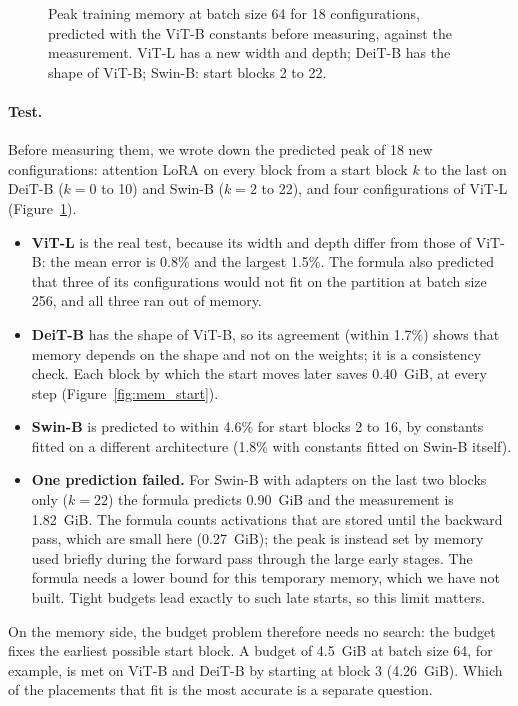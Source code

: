 \begin{figure}[!htb]
\centering

\caption{Peak training memory at batch size 64 for 18 configurations, predicted with the ViT-B constants before
measuring, against the measurement. ViT-L has a new width and depth; DeiT-B has the shape of ViT-B; Swin-B: start
blocks 2 to 22.}
\label{fig:mem_pred}
\end{figure}

\paragraph{Test.} Before measuring them, we wrote down the predicted peak of 18 new configurations: attention LoRA
on every block from a start block $k$ to the last on DeiT-B ($k = 0$ to 10) and Swin-B ($k = 2$ to 22), and four
configurations of ViT-L (Figure~\ref{fig:mem_pred}).
\begin{itemize}
  \item \textbf{ViT-L} is the real test, because its width and depth differ from those of ViT-B: the mean error is
        0.8\% and the largest 1.5\%. The formula also predicted that three of its configurations would not fit on
        the partition at batch size 256, and all three ran out of memory.
  \item \textbf{DeiT-B} has the shape of ViT-B, so its agreement (within 1.7\%) shows that memory depends on the
        shape and not on the weights; it is a consistency check. Each block by which the start moves later saves
        0.40~GiB, at every step (Figure~\ref{fig:mem_start}).
  \item \textbf{Swin-B} is predicted to within 4.6\% for start blocks 2 to 16, by constants fitted on a different
        architecture (1.8\% with constants fitted on Swin-B itself).
  \item \textbf{One prediction failed.} For Swin-B with adapters on the last two blocks only ($k=22$) the formula
        predicts 0.90~GiB and the measurement is 1.82~GiB. The formula counts activations that are stored until the
        backward pass, which are small here (0.27~GiB); the peak is instead set by memory used briefly during the
        forward pass through the large early stages. The formula needs a lower bound for this temporary memory,
        which we have not built. Tight budgets lead exactly to such late starts, so this limit matters.
\end{itemize}

On the memory side, the budget problem therefore needs no search: the budget fixes the earliest possible start
block. A budget of 4.5~GiB at batch size 64, for example, is met on ViT-B and DeiT-B by starting at block 3
(4.26~GiB). Which of the placements that fit is the most accurate is a separate question.

